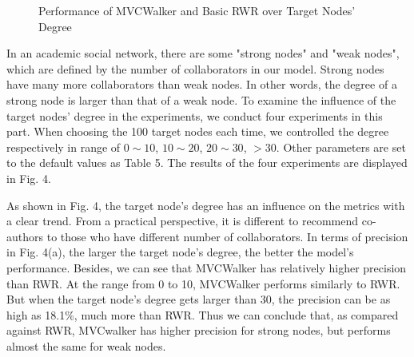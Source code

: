 \documentclass[10pt,journal,compsoc]{IEEEtran}
\begin{document}
\begin{figure}
\centering
{}
\caption{Performance of MVCWalker and Basic RWR over Target Nodes' Degree}
\label{fig:4}       %
\end{figure}
In an academic social network, there are some "strong nodes" and "weak nodes", which are defined by the number of collaborators in our model. Strong nodes have many more collaborators than weak nodes. In other words, the degree of a strong node is larger than that of a weak node. To examine the influence of the target nodes' degree in the experiments, we conduct four experiments in this part. When choosing the 100 target nodes each time, we controlled the degree respectively in range of $0\sim10$, $10\sim20$, $20\sim30$, $>30$. Other parameters are set to the default values as Table 5. The results of the four experiments are displayed in Fig. 4.

As shown in Fig. 4, the target node's degree has an influence on the metrics with a clear trend. From a practical perspective, it is different to recommend co-authors to those who have different number of collaborators. In terms of precision in Fig. 4(a), the larger the target node's degree, the better the model's performance. Besides, we can see that MVCWalker has relatively higher precision than RWR. At the range from 0 to 10, MVCWalker performs similarly to RWR. But when the target node's degree gets larger than 30, the precision can be as high as 18.1\%, much more than RWR. Thus we can conclude that, as compared against RWR, MVCwalker has higher precision for strong nodes, but performs almost the same for weak nodes.
\end{document}
